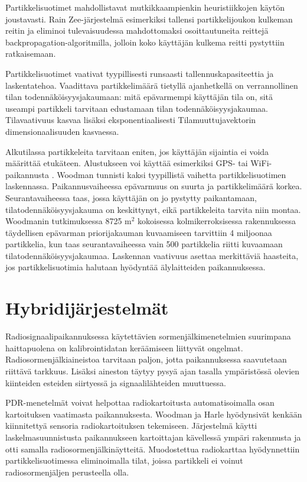 Partikkelisuotimet mahdollistavat mutkikkaampienkin heuristiikkojen
käytön joustavasti. Rain \cite{rai2012} Zee-järjestelmä esimerkiksi
tallensi partikkelijoukon kulkeman reitin ja eliminoi tulevaisuudessa
mahdottomaksi osoittautuneita reittejä backpropagation-algoritmilla, jolloin
koko käyttäjän kulkema reitti pystyttiin ratkaisemaan.

Partikkelisuotimet vaativat tyypillisesti runsaasti tallennuskapasiteettia
ja laskentatehoa. Vaadittava partikkelimäärä tietyllä ajanhetkellä 
on verrannollinen
tilan todennäköisyysjakaumaan: mitä epävarmempi käyttäjän tila on, sitä
useampi partikkeli tarvitaan edustamaan tilan todennäköisyysjakaumaa.
Tilavaativuus kasvaa lisäksi eksponentiaalisesti
Tilamuuttujavektorin dimensionaalisuuden kasvaessa.

Alkutilassa partikkeleita tarvitaan eniten, jos käyttäjän sijaintia ei
voida määrittää etukäteen. Alustukseen voi käyttää esimerkiksi
GPS- tai WiFi-paikannusta \cite{woodman2009}. Woodman \cite{woodman2010}
tunnisti kaksi tyypillistä
vaihetta partikkelisuotimen laskennassa. Paikannusvaiheessa epävarmuus
on suurta ja partikkelimäärä korkea. Seurantavaiheessa taas, jossa käyttäjän
on jo pystytty paikantamaan, tilatodennäköisyysjakauma on keskittynyt, eikä
partikkeleita tarvita niin montaa. Woodmanin tutkimuksessa 8725
$\text{m}^2$ kokoisessa kolmikerroksisessa rakennuksessa täydellisen epävarman
priorijakauman kuvaamiseen tarvittiin 4 miljoonaa partikkelia, kun taas
seurantavaiheessa vain 500 partikkelia riitti kuvaamaan
tilatodennäköisyysjakaumaa. Laskennan vaativuus asettaa merkittäviä
haasteita, jos partikkelisuotimia halutaan hyödyntää älylaitteiden
paikannuksessa.

\section{Hybridijärjestelmät}

Radiosignaalipaikannuksessa käytettävien sormenjälkimenetelmien suurimpana
haittapuolena on kalibrointidatan keräämiseen liittyvät ongelmat.
Radiosormenjälkiaineistoa tarvitaan paljon, jotta paikannuksessa saavutetaan
riittävä tarkkuus.
Lisäksi aineston täytyy pysyä ajan tasalla
ympäristössä olevien kiinteiden esteiden siirtyessä ja signaalilähteiden
muuttuessa.

PDR-menetelmät voivat helpottaa radiokartoitusta automatisoimalla osan
kartoituksen vaatimasta paikannuksesta. Woodman ja Harle \cite{woodman2008}
hyödynsivät
kenkään kiinnitettyä sensoria radiokartoituksen tekemiseen. Järjestelmä
käytti laskelmasuunnistusta paikannukseen kartoittajan kävellessä
ympäri rakennusta ja otti samalla radiosormenjälkinäytteitä. 
Muodostettua radiokarttaa hyödynnettiin partikkelisuotimessa
eliminoimalla tilat, joissa partikkeli ei voinut radiosormenjäljen
perusteella olla.

